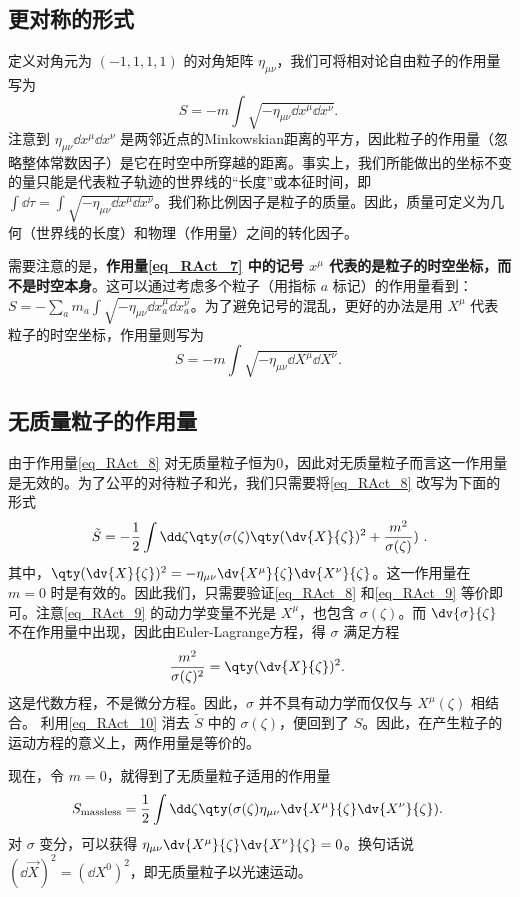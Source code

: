 \subsection{更对称的形式}
定义对角元为 $(-1,1,1,1)$ 的对角矩阵 $\eta_{\mu\nu}$，我们可将相对论自由粒子的作用量写为
\begin{equation}\label{eq_RAct_7}
S=-m\int \sqrt{-\eta_{\mu\nu}\dd x^\mu\dd x^\nu}.~
\end{equation}
注意到 $\eta_{\mu\nu}\dd x^\mu\dd x^\nu$ 是两邻近点的Minkowskian距离的平方，因此粒子的作用量（忽略整体常数因子）是它在时空中所穿越的距离。事实上，我们所能做出的坐标不变的量只能是代表粒子轨迹的世界线的“长度”或本征时间，即 $\int\dd \tau=\int \sqrt{-\eta_{\mu\nu}\dd x^\mu\dd x^\nu}$。我们称比例因子是粒子的质量。因此，质量可定义为几何（世界线的长度）和物理（作用量）之间的转化因子。

需要注意的是，\textbf{作用量\autoref{eq_RAct_7} 中的记号 $x^\mu$ 代表的是粒子的时空坐标，而不是时空本身}。这可以通过考虑多个粒子（用指标 $a$ 标记）的作用量看到： $S=-\sum_a m_a\int \sqrt{-\eta_{\mu\nu}\dd x_a^\mu\dd x_a^\nu}$。为了避免记号的混乱，更好的办法是用 $X^\mu$ 代表粒子的时空坐标，作用量则写为
\begin{equation}\label{eq_RAct_8}
S=-m\int \sqrt{-\eta_{\mu\nu}\dd X^\mu\dd X^\nu}.~
\end{equation}


\subsection{无质量粒子的作用量}
由于作用量\autoref{eq_RAct_8} 对无质量粒子恒为0，因此对无质量粒子而言这一作用量是无效的。为了公平的对待粒子和光，我们只需要将\autoref{eq_RAct_8} 改写为下面的形式
\begin{equation}\label{eq_RAct_9}
\tilde S=-\frac{1}{2}\int\dd\zeta\qty(\sigma(\zeta)\qty(\dv{X}{\zeta})^2+\frac{m^2}{\sigma(\zeta)})~.
\end{equation}
其中，$\qty(\dv{X}{\zeta})^2=-\eta_{\mu\nu}\dv{X^\mu}{\zeta}\dv{X^\nu}{\zeta}$。这一作用量在 $m=0$ 时是有效的。因此我们，只需要验证\autoref{eq_RAct_8} 和\autoref{eq_RAct_9} 等价即可。注意\autoref{eq_RAct_9} 的动力学变量不光是 $X^\mu$，也包含 $\sigma(\zeta)$。而 $\dv{\sigma}{\zeta}$ 不在作用量中出现，因此由Euler-Lagrange方程，得 $\sigma$ 满足方程
\begin{equation}\label{eq_RAct_10}
\frac{m^2}{\sigma(\zeta)^2}=\qty(\dv{X}{\zeta})^2.~
\end{equation}
这是代数方程，不是微分方程。因此，$\sigma$ 并不具有动力学而仅仅与 $X^\mu(\zeta)$ 相结合。
利用\autoref{eq_RAct_10} 消去 $\tilde S$ 中的 $\sigma(\zeta)$，便回到了 $S$。因此，在产生粒子的运动方程的意义上，两作用量是等价的。

现在，令 $m=0$，就得到了无质量粒子适用的作用量
\begin{equation}
 S_{\mathrm{massless}}=\frac{1}{2}\int\dd\zeta\qty(\sigma(\zeta)\eta_{\mu\nu}\dv{X^\mu}{\zeta}\dv{X^\nu}{\zeta}).~
\end{equation}
对 $\sigma$ 变分，可以获得 $\eta_{\mu\nu}\dv{X^\mu}{\zeta}\dv{X^\nu}{\zeta}=0$。换句话说 $(\dd{\vec X})^2=(\dd X^0)^2$，即无质量粒子以光速运动。


